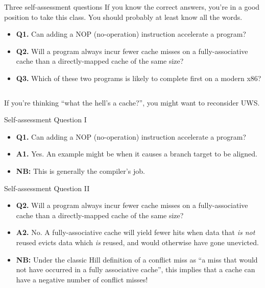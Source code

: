 \documentclass{beamer}
\newcommand{\code}[2]{
  \tiny{{}}
}
\begin{document}
\begin{frame}{Three self-assessment questions}
If you know the correct answers, you're in a good position to take this
class. You should probably at least know all the words.
\vspace{.1in}
\begin{itemize}
\item \textbf{Q1.} Can adding a NOP (no-operation) instruction accelerate a program?
\item \textbf{Q2.} Will a program always incur fewer cache misses on a fully-associative
	cache than a directly-mapped cache of the same size?
\item \textbf{Q3.} Which of these two programs is likely to complete first
	on a modern x86?\\
\begin{columns}
\begin{column}{.5\textwidth}
\code{A}{code/introq3a.S}
\end{column}
\begin{column}{.5\textwidth}
\code{B}{code/introq3b.S}
\end{column}
\end{columns}
\end{itemize}
\vspace{.1in}
If you're thinking ``what the hell's a cache?'', you might want to reconsider UWS.
\end{frame}

\begin{frame}{Self-assessment Question I}
\begin{itemize}
\item \textbf{Q1.} Can adding a NOP (no-operation) instruction accelerate a program?
\item \textbf{A1.} Yes. An example might be when it causes a branch target to 
 be aligned.
\item \textbf{NB:} This is generally the compiler's job.
\end{itemize}
\end{frame}

\begin{frame}{Self-assessment Question II}
\begin{itemize}
\item \textbf{Q2.} Will a program always incur fewer cache misses on a fully-associative
	cache than a directly-mapped cache of the same size?
\item \textbf{A2.} No. A fully-associative cache will yield fewer hits when
  data that \textit{is not} reused evicts data which \textit{is} reused, and
  would otherwise have gone unevicted.
\item \textbf{NB:} Under the classic Hill definition of a conflict miss as ``a
  miss that would not have occurred in a fully associative cache'', this
  implies that a cache can have a negative number of conflict misses!
\end{itemize}
\end{frame}
\end{document}
